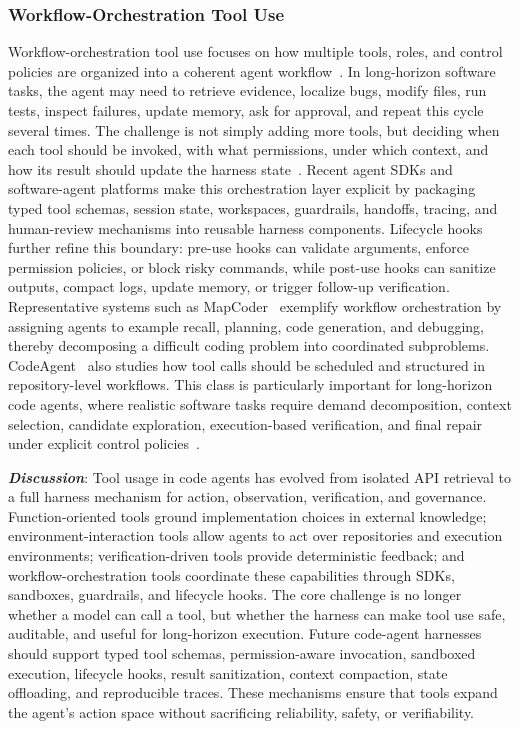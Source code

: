 \documentclass{llmxive}
\begin{document}
\subsubsection{Workflow-Orchestration Tool Use}
Workflow-orchestration tool use focuses on how multiple tools, roles, and control policies are organized into a coherent agent workflow~\cite{xiong2025self,shi2025flowxpert,lumer2025tool, su2025toolorchestra}. In long-horizon software tasks, the agent may need to retrieve evidence, localize bugs, modify files, run tests, inspect failures, update memory, ask for approval, and repeat this cycle several times. The challenge is not simply adding more tools, but deciding when each tool should be invoked, with what permissions, under which context, and how its result should update the harness state~\cite{liu2024toolnet}. Recent agent SDKs and software-agent platforms make this orchestration layer explicit by packaging typed tool schemas, session state, workspaces, guardrails, handoffs, tracing, and human-review mechanisms into reusable harness components. Lifecycle hooks further refine this boundary: pre-use hooks can validate arguments, enforce permission policies, or block risky commands, while post-use hooks can sanitize outputs, compact logs, update memory, or trigger follow-up verification. Representative systems such as MapCoder~\cite{islam2024mapcoder} exemplify workflow orchestration by assigning agents to example recall, planning, code generation, and debugging, thereby decomposing a difficult coding problem into coordinated subproblems. CodeAgent~\cite{zhang2024codeagent} also studies how tool calls should be scheduled and structured in repository-level workflows. This class is particularly important for long-horizon code agents, where realistic software tasks require demand decomposition, context selection, candidate exploration, execution-based verification, and final repair under explicit control policies~\cite{liu2024toolnet,liu2024controlllm}.


\textbf{\textit{Discussion}}: Tool usage in code agents has evolved from isolated API retrieval to a full harness mechanism for action, observation, verification, and governance. Function-oriented tools ground implementation choices in external knowledge; environment-interaction tools allow agents to act over repositories and execution environments; verification-driven tools provide deterministic feedback; and workflow-orchestration tools coordinate these capabilities through SDKs, sandboxes, guardrails, and lifecycle hooks. The core challenge is no longer whether a model can call a tool, but whether the harness can make tool use safe, auditable, and useful for long-horizon execution. Future code-agent harnesses should support typed tool schemas, permission-aware invocation, sandboxed execution, lifecycle hooks, result sanitization, context compaction, state offloading, and reproducible traces. These mechanisms ensure that tools expand the agent's action space without sacrificing reliability, safety, or verifiability.
\end{document}
